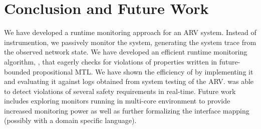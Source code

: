 
\section{Conclusion and Future Work}
We have developed a runtime monitoring approach for an ARV system.
Instead of instrumention, we passively monitor the system,
generating the system trace from the observed network state.
We have developed an efficient runtime monitoring algorithm, \monitor,
that eagerly checks for violations of properties written in future-bounded
propositional MTL. We have shown the efficiency of \monitor by implementing it
and evaluating it against logs obtained from system testing of the ARV.
\monitor was able to detect violations of several safety requirements in real-time.
Future work includes exploring monitors running in multi-core environment
to provide increased monitoring power as well as further
formalizing the interface mapping (possibly with a domain specific language).
